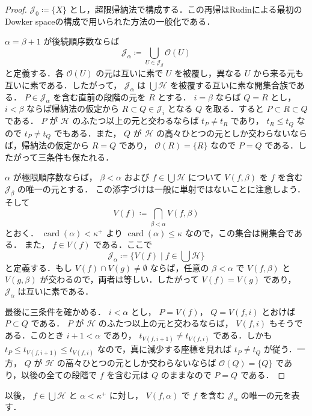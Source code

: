 \documentclass[leqno, 12pt]{ltjsarticle}
\newcommand{\kappasucc}{\kappa^{+}}
\DeclareMathOperator{\card}{card}
\begin{document}
\begin{proof}
$\mathcal{J}_{0}\coloneqq\{X\}$
とし，超限帰納法で構成する．この再帰はRudinによる最初のDowker spaceの構成で用いられた方法の一般化である\cite{1}．

$\alpha=\beta+1$
が後続順序数ならば
\[
\mathcal{J}_{\alpha}\coloneqq\bigcup_{U\in \mathcal{J}_{\beta}}\mathcal{O}(U)
\]
と定義する．各
$\mathcal{O}(U)$
の元は互いに素で
$U$
を被覆し，異なる
$U$
から来る元も互いに素である．したがって，
$\mathcal{J}_{\alpha}$
は
$\bigcup\mathcal{H}$
を被覆する互いに素な開集合族である．
$P\in\mathcal{J}_{\alpha}$
を含む直前の段階の元を
$R$
とする．
$i=\beta$
ならば
$Q=R$
とし，
$i<\beta$
ならば帰納法の仮定から
$R\subset Q\in\mathcal{J}_{i}$
となる
$Q$
を取る．すると
$P\subset R\subset Q$
である．
$P$
が
$\mathcal{H}$
のふたつ以上の元と交わるならば
$t_{P}\neq t_{R}$
であり，
$t_{R}\le t_{Q}$
なので
$t_{P}\neq t_{Q}$
でもある．また，
$Q$
が
$\mathcal{H}$
の高々ひとつの元としか交わらないならば，帰納法の仮定から
$R=Q$
であり，
$\mathcal{O}(R)=\{R\}$
なので
$P=Q$
である．したがって三条件も保たれる．

$\alpha$
が極限順序数ならば，
$\beta<\alpha$
および
$f\in \bigcup\mathcal{H}$
について
$V(f,\beta)$
を
$f$
を含む
$\mathcal{J}_{\beta}$
の唯一の元とする．
この添字づけは一般に単射ではないことに注意しよう．
そして
\[
V(f)\coloneqq\bigcap_{\beta<\alpha}V(f,\beta)
\]
とおく．
$\card(\alpha)<\kappasucc$
より
$\card(\alpha)\le\kappa$
なので，この集合は開集合である．
また，
$f\in V(f)$
である．ここで
\[
\mathcal{J}_{\alpha}
\coloneqq\{V(f) \mid f\in \bigcup\mathcal{H}\}
\]
と定義する．もし
$V(f)\cap V(g)\neq\emptyset$
ならば，任意の
$\beta<\alpha$
で
$V(f,\beta)$
と
$V(g,\beta)$
が交わるので，両者は等しい．したがって
$V(f)=V(g)$
であり，
$\mathcal{J}_{\alpha}$
は互いに素である．

最後に三条件を確かめる．
$i<\alpha$
とし，
$P=V(f)$，
$Q=V(f,i)$
とおけば
$P\subset Q$
である．
$P$
が
$\mathcal{H}$
のふたつ以上の元と交わるならば，
$V(f,i)$
もそうである．このとき
$i+1<\alpha$
であり，
$t_{V(f,i+1)}\neq t_{V(f,i)}$
である．しかも
$t_{P}\le t_{V(f,i+1)}\le t_{V(f,i)}$
なので，真に減少する座標を見れば
$t_{P}\neq t_{Q}$
が従う．一方，
$Q$
が
$\mathcal{H}$
の高々ひとつの元としか交わらないならば
$\mathcal{O}(Q)=\{Q\}$
であり，以後の全ての段階で
$f$
を含む元は
$Q$
のままなので
$P=Q$
である．

\end{proof}

以後，
$f\in\bigcup\mathcal{H}$
と
$\alpha<\kappasucc$
に対し，
$V(f,\alpha)$
で
$f$
を含む
$\mathcal{J}_{\alpha}$
の唯一の元を表す．
\end{document}
